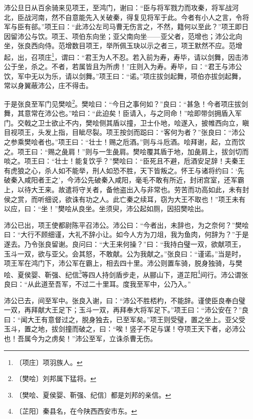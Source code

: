 \documentclass[12pt,UTF-8,openany,a4]{ctexbook}
\begin{document}
\begin{large}
    沛公旦日从百余骑来见项王，至鸿门，谢曰：“臣与将军戮力而攻秦，将军战河北，臣战河南，然不自意能先入关破秦，得复见将军于此。今者有小人之言，令将军与臣有郤。”项王曰：“此沛公左司马曹无伤言之，不然，籍何以至此？”项王即日因留沛公与饮。项王、项伯东向坐；亚父南向坐——亚父者，范增也；沛公北向坐，张良西向侍。范增数目项王，举所佩玉玦以示之者三，项王默然不应。范增起，出，召项庄\footnote{〔项庄〕\yiwen 项羽族人。}，谓曰：“君王为人不忍。若入前为寿，寿毕，请以剑舞，因击沛公于坐，杀之。不者，若属皆且为所虏！”庄则入为寿。寿毕，曰：“君王与沛公饮，军中无以为乐，请以剑舞。”项王曰：“诺。”项庄拔剑起舞，项伯亦拔剑起舞，常以身翼蔽沛公，庄不得击。
    
    于是张良至军门见樊哙\footnote{〔樊哙〕\yiwen 刘邦属下猛将。}。樊哙曰：“今日之事何如？”良曰：“甚急！今者项庄拔剑舞，其意常在沛公也。”哙曰：“此迫矣！臣请入，与之同命！”哙即带剑拥盾入军门。交戟之卫士欲止不内，樊哙侧其盾以撞，卫士仆地，哙遂入，披帷西向立，瞋目视项王，头发上指，目眦尽裂。项王按剑而跽曰：“客何为者？”张良曰：“沛公之参乘樊哙者也。”项王曰：“壮士！赐之卮酒。”则与斗卮酒。哙拜谢，起，立而饮之。项王曰：“赐之彘肩！”则与一生彘肩。樊哙覆其盾于地，加彘肩上，拔剑切而啖之。项王曰：“壮士！能复饮乎？”樊哙曰：“臣死且不避，卮酒安足辞！夫秦王有虎狼之心，杀人如不能举，刑人如恐不胜，天下皆叛之。怀王与诸将约曰：‘先破秦入咸阳者王之’，今沛公先破秦入咸阳，毫毛不敢有所近，封闭宫室，还军霸上，以待大王来。故遣将守关者，备他盗出入与非常也。劳苦而功高如此，未有封侯之赏，而听细说，欲诛有功之人。此亡秦之续耳，窃为大王不取也！”项王未有以应，曰：“坐！”樊哙从良坐。坐须臾，沛公起如厕，因招樊哙出。
    
    沛公已出，项王使都尉陈平召沛公。沛公曰：“今者出，未辞也，为之奈何？”樊哙曰：“大行不顾细谨，大礼不辞小让。如今人方为刀俎，我为鱼肉，何辞为？”于是遂去。乃令张良留谢。良问曰：“大王来何操？”曰：“我持白璧一双，欲献项王，玉斗一双，欲与亚父。会其怒，不敢献。公为我献之。”张良曰：“谨诺。”当是时，项王军在鸿门下，沛公军在霸上，相去四十里。沛公则置车骑，脱身独骑，与樊哙、夏侯婴、靳强、纪信\footnote{〔樊哙、夏侯婴、靳强、纪信〕\yiwen 都是刘邦的亲信。}等四人持剑盾步走，从郦山下，道芷阳\footnote{〔芷阳〕\yiwen 秦县名，在今陕西西安市东。}间行。沛公谓张良曰：“从此道至吾军，不过二十里耳。度我至军中，公乃入。”
    
    沛公已去，间至军中。张良入谢，曰：“沛公不胜桮杓，不能辞。谨使臣良奉白璧一双，再拜献大王足下；玉斗一双，再拜奉大将军足下。”项王曰：“沛公安在？”良曰：“闻大王有意督过之，脱身独去，已至军矣。”项王则受璧，置之坐上。亚父受玉斗，置之地，拔剑撞而破之，曰：“唉！竖子不足与谋！夺项王天下者，必沛公也！吾属今为之虏矣！”沛公至军，立诛杀曹无伤。

\end{large}
\end{document}
